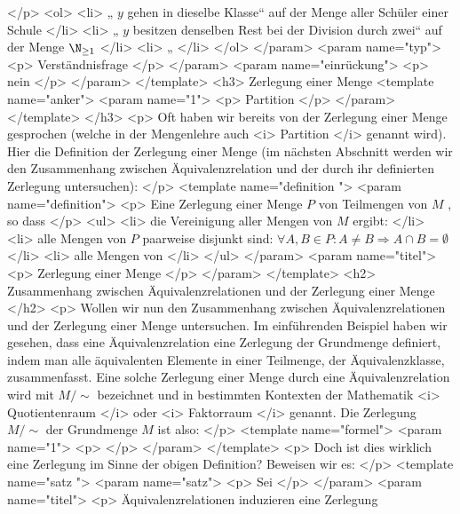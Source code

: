     </p>
    <ol>
     <li>
      „
      $y$
      gehen in dieselbe Klasse“ auf der Menge aller Schüler einer Schule
     </li>
     <li>
      „
      $y$
      besitzen denselben Rest bei der Division durch zwei“ auf der Menge
      $\N_{\ge1}$
     </li>
     <li>
      „
     </li>
    </ol>
   </param>
   <param name="typ">
    <p>
     Verständnisfrage
    </p>
   </param>
   <param name="einrückung">
    <p>
     nein
    </p>
   </param>
  </template>
  <h3>
   Zerlegung einer Menge
   <template name="anker">
    <param name="1">
     <p>
      Partition
     </p>
    </param>
   </template>
  </h3>
  <p>
   Oft haben wir bereits von der Zerlegung einer Menge gesprochen (welche in der Mengenlehre auch
   <i>
    Partition
   </i>
   genannt wird). Hier die Definition der Zerlegung einer Menge (im nächsten Abschnitt werden wir den Zusammenhang zwischen Äquivalenzrelation und der durch ihr definierten Zerlegung untersuchen):
  </p>
  <template name="definition
 ">
   <param name="definition">
    <p>
     Eine Zerlegung einer Menge
     $P$
     von Teilmengen von
     $M$
     , so dass
    </p>
    <ul>
     <li>
      die Vereinigung aller Mengen von
      $M$
      ergibt:
     </li>
     <li>
      alle Mengen von
      $P$
      paarweise disjunkt sind:
      $\forall A, B\in P: A\ne B \Rightarrow A \cap B = \emptyset$
     </li>
     <li>
      alle Mengen von
     </li>
    </ul>
   </param>
   <param name="titel">
    <p>
     Zerlegung einer Menge
    </p>
   </param>
  </template>
  <h2>
   Zusammenhang zwischen Äquivalenzrelationen und der Zerlegung einer Menge
  </h2>
  <p>
   Wollen wir nun den Zusammenhang zwischen Äquivalenzrelationen und der Zerlegung einer Menge untersuchen. Im einführenden Beispiel haben wir gesehen, dass eine Äquivalenzrelation eine Zerlegung der Grundmenge definiert, indem man alle äquivalenten Elemente in einer Teilmenge, der Äquivalenzklasse, zusammenfasst. Eine solche Zerlegung einer Menge durch eine Äquivalenzrelation wird mit
   ${M/{\sim}}$
   bezeichnet und in bestimmten Kontexten der Mathematik
   <i>
    Quotientenraum
   </i>
   oder
   <i>
    Faktorraum
   </i>
   genannt. Die Zerlegung
   ${M/{\sim}}$
   der Grundmenge
   $M$
   ist also:
  </p>
  <template name="formel">
   <param name="1">
    <p>
    </p>
   </param>
  </template>
  <p>
   Doch ist dies wirklich eine Zerlegung im Sinne der obigen Definition? Beweisen wir es:
  </p>
  <template name="satz
 ">
   <param name="satz">
    <p>
     Sei
    </p>
   </param>
   <param name="titel">
    <p>
     Äquivalenzrelationen induzieren eine Zerlegung

